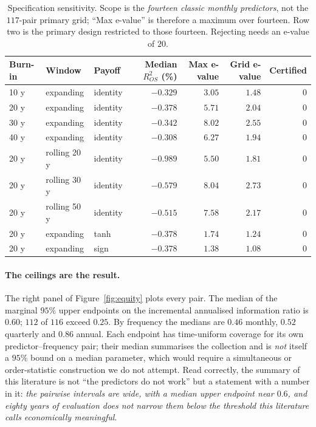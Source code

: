 \documentclass{article}
\theoremstyle{plain}
\theoremstyle{definition}
\newcommand{\rsq}{R^2_{OS}}
\begin{document}
\begin{table}[t]
  \centering
  \caption{Specification sensitivity. Scope is the \emph{fourteen classic monthly predictors},
  not the $117$-pair primary grid; ``Max e-value'' is therefore a maximum over fourteen. Row two
  is the primary design restricted to those fourteen. Rejecting needs an e-value of $20$.}
  \label{tab:sensitivity}
  \small
  \begin{tabular}{lllrrrr}
    \toprule
    Burn-in & Window & Payoff & Median $\rsq$ (\%) & Max e-value & Grid e-value & Certified \\
    \midrule
    10 y & expanding   & identity & $-0.329$ & $3.05$ & $1.48$ & $0$ \\
    20 y & expanding   & identity & $-0.378$ & $5.71$ & $2.04$ & $0$ \\
    30 y & expanding   & identity & $-0.342$ & $8.02$ & $2.55$ & $0$ \\
    40 y & expanding   & identity & $-0.308$ & $6.27$ & $1.94$ & $0$ \\
    20 y & rolling 20 y & identity & $-0.989$ & $5.50$ & $1.81$ & $0$ \\
    20 y & rolling 30 y & identity & $-0.579$ & $8.04$ & $2.73$ & $0$ \\
    20 y & rolling 50 y & identity & $-0.515$ & $7.58$ & $2.17$ & $0$ \\
    20 y & expanding   & tanh     & $-0.378$ & $1.74$ & $1.24$ & $0$ \\
    20 y & expanding   & sign     & $-0.378$ & $1.38$ & $1.08$ & $0$ \\
    \bottomrule
  \end{tabular}
\end{table}

\paragraph{The ceilings are the result.} The right panel of Figure~\ref{fig:equity} plots
every pair. The median of the marginal $95\%$ upper endpoints on the incremental annualised
information ratio is $0.60$; $112$ of $116$ exceed $0.25$. By frequency the medians are $0.46$
monthly, $0.52$ quarterly and $0.86$ annual. Each endpoint has time-uniform coverage for its own
predictor--frequency pair; their median summarises the collection and is \emph{not} itself a
$95\%$ bound on a median parameter, which would require a simultaneous or order-statistic
construction we do not attempt. Read correctly, the summary of this literature is not ``the
predictors do not work'' but a statement with a number in it: \emph{the pairwise intervals are
wide, with a median upper endpoint near $0.6$, and eighty years of evaluation does not narrow
them below the threshold this literature calls economically meaningful}.
\end{document}
